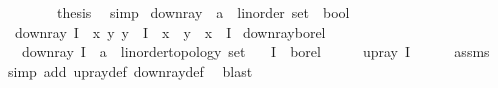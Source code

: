 \begin{isabellebody}
\ \ \isamarkupfalse%
\isanewline
\ \ \isamarkupfalse%
\ \isamarkupfalse%
\ {\isacharquery}{\kern0pt}thesis\ \isamarkupfalse%
\ simp\isanewline
{}\isamarkupfalse%
%
\endisatagproof
{\isafoldproof}%
%
\isadelimproof
\isanewline
%
\endisadelimproof
\isanewline
{}\isamarkupfalse%
\ down{\isacharunderscore}{\kern0pt}ray\ {\isacharcolon}{\kern0pt}{\isacharcolon}{\kern0pt}\ {\isachardoublequoteopen}{\isacharparenleft}{\kern0pt}{\isacharprime}{\kern0pt}a\ {\isacharcolon}{\kern0pt}{\isacharcolon}{\kern0pt}\ linorder{\isacharparenright}{\kern0pt}\ set\ {\isasymRightarrow}\ bool{\isachardoublequoteclose}\ \isanewline
\ \ {\isachardoublequoteopen}down{\isacharunderscore}{\kern0pt}ray\ I\ {\isacharequal}{\kern0pt}\ {\isacharparenleft}{\kern0pt}{\isasymforall}x\ y{\isachardot}{\kern0pt}\ y\ {\isasymin}\ I\ {\isasymlongrightarrow}\ x\ {\isasymle}\ y\ {\isasymlongrightarrow}\ x\ {\isasymin}\ I{\isacharparenright}{\kern0pt}{\isachardoublequoteclose}\isanewline
\isanewline
{}\isamarkupfalse%
\ down{\isacharunderscore}{\kern0pt}ray{\isacharunderscore}{\kern0pt}borel{\isacharcolon}{\kern0pt}\isanewline
\ \ \ {\isachardoublequoteopen}down{\isacharunderscore}{\kern0pt}ray\ {\isacharparenleft}{\kern0pt}I\ {\isacharcolon}{\kern0pt}{\isacharcolon}{\kern0pt}\ {\isacharparenleft}{\kern0pt}{\isacharparenleft}{\kern0pt}{\isacharprime}{\kern0pt}a\ {\isacharcolon}{\kern0pt}{\isacharcolon}{\kern0pt}\ linorder{\isacharunderscore}{\kern0pt}topology{\isacharparenright}{\kern0pt}\ set{\isacharparenright}{\kern0pt}{\isacharparenright}{\kern0pt}{\isachardoublequoteclose}\isanewline
\ \ \ {\isachardoublequoteopen}I\ {\isasymin}\ borel{\isachardoublequoteclose}\isanewline
%
\isadelimproof
%
\endisadelimproof
%
\isatagproof
{}\isamarkupfalse%
\ {\isacharminus}{\kern0pt}\isanewline
\ \ \isamarkupfalse%
\ {\isachardoublequoteopen}up{\isacharunderscore}{\kern0pt}ray\ {\isacharparenleft}{\kern0pt}{\isacharminus}{\kern0pt}I{\isacharparenright}{\kern0pt}{\isachardoublequoteclose}\isanewline
\ \ \ \ \isamarkupfalse%
\ assms\ \isamarkupfalse%
\ {\isacharparenleft}{\kern0pt}simp\ add{\isacharcolon}{\kern0pt}\ up{\isacharunderscore}{\kern0pt}ray{\isacharunderscore}{\kern0pt}def\ down{\isacharunderscore}{\kern0pt}ray{\isacharunderscore}{\kern0pt}def{\isacharparenright}{\kern0pt}\ \isamarkupfalse%
\ blast\isanewline
\ \ \isamarkupfalse%

\end{isabellebody}
